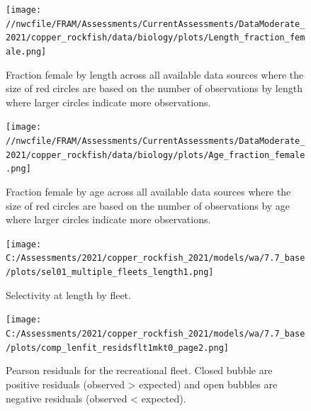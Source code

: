 \documentclass[11pt,
  english,
  a4paper,
]{article}
\begin{document}
\tagmcend\tagstructend

\clearpage


\begin{figure}
\centering
\texttt{[image: //nwcfile/FRAM/Assessments/CurrentAssessments/DataModerate\_2021/copper\_rockfish/data/biology/plots/Length\_fraction\_female.png]}
\caption{Fraction female by length across all available data sources where the size of red circles are based on the number of observations by length where larger circles indicate more observations.\label{fig:len-sex-ratio}}
\end{figure}

\tagmcend\tagstructend


\begin{figure}
\centering
\texttt{[image: //nwcfile/FRAM/Assessments/CurrentAssessments/DataModerate\_2021/copper\_rockfish/data/biology/plots/Age\_fraction\_female.png]}
\caption{Fraction female by age across all available data sources where the size of red circles are based on the number of observations by age where larger circles indicate more observations.\label{fig:age-sex-ratio}}
\end{figure}

\tagmcend\tagstructend


\begin{figure}
\centering
\texttt{[image: C:/Assessments/2021/copper\_rockfish\_2021/models/wa/7.7\_base/plots/sel01\_multiple\_fleets\_length1.png]}
\caption{Selectivity at length by fleet.\label{fig:selex}}
\end{figure}

\tagmcend\tagstructend


\begin{figure}
\centering
\texttt{[image: C:/Assessments/2021/copper\_rockfish\_2021/models/wa/7.7\_base/plots/comp\_lenfit\_residsflt1mkt0\_page2.png]}
\caption{Pearson residuals for the recreational fleet. Closed bubble are positive residuals (observed \textgreater{} expected) and open bubbles are negative residuals (observed \textless{} expected).\label{fig:rec-pearson}}
\end{figure}
\end{document}
